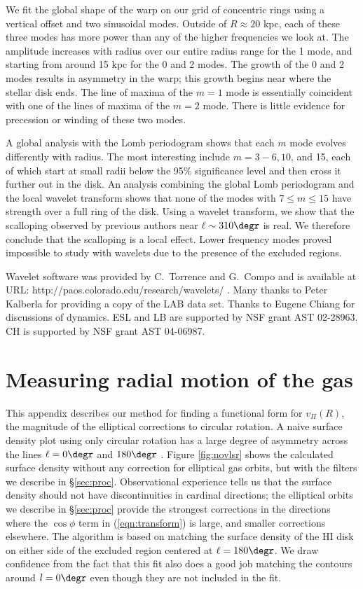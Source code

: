 \documentclass[apj]{emulateapj}
\begin{document}
We fit the global shape of the warp on our grid of concentric rings using a vertical offset and two sinusoidal modes. Outside of $R\approx20$ kpc, each of these three modes has  more power than any of the higher frequencies we look at. The amplitude increases with radius over our entire radius range for the 1 mode, and starting from around 15 kpc for the 0 and 2 modes. The growth of the 0 and 2 modes results in  asymmetry in the warp; this growth begins near where the stellar disk ends.
The line of maxima of the $m=1$ mode is essentially coincident with one of the lines of maxima of the $m=2$ mode. There is little evidence for precession or winding of these two modes.

A global analysis with the Lomb periodogram shows that each $m$ mode evolves differently with radius. The most interesting include $m=3-6,10$, and 15, each of which start at small radii below the 95\% significance level and then cross it further out in the disk.  An analysis combining the global Lomb periodogram and the local wavelet transform shows that none of the modes with $7\le m\le15$  have strength over a full ring of the disk. Using a wavelet transform, we show that the scalloping observed by previous authors near $\ell\sim 310\degr$ is real. We therefore conclude that the scalloping is a local effect.
 Lower frequency modes proved impossible to study with wavelets due to the presence of the excluded regions. 
 

\acknowledgments

 Wavelet software was provided by C.~Torrence and G.~Compo and is available at URL: http://paos.colorado.edu/research/wavelets/ \citep{TC1998}. Many thanks to Peter Kalberla for providing a copy of the LAB data set.   Thanks to Eugene Chiang for discussions of dynamics. ESL and LB are supported by NSF grant AST 02-28963. CH is supported by NSF grant AST 04-06987.

\appendix
\section{Measuring radial motion of the gas} 



This appendix describes our method for finding a functional form for $v_\Pi(R)$, the magnitude of the elliptical corrections to circular rotation. A naive surface density plot using only circular rotation has a large degree of asymmetry across the lines $\ell=0\degr$ and $180\degr$ \citep{KBH1982}. Figure \ref{fig:novlsr} shows the calculated surface density without any correction for elliptical gas orbits, but with the filters we describe in \S\ref{sec:proc}. Observational experience tells us that the surface density should not have discontinuities in cardinal directions; the elliptical orbits we describe in \S \ref{sec:proc} provide the strongest corrections in the directions where the $\cos \phi$ term in (\ref{eqn:transform}) is large, and smaller corrections elsewhere.  The algorithm is based on matching the surface density of the HI disk on either side of the excluded region centered at $\ell = 180\degr$. We draw confidence from the fact that this fit also does a good job matching the contours around $l=0\degr$ even though they are not included in the fit.
\end{document}
